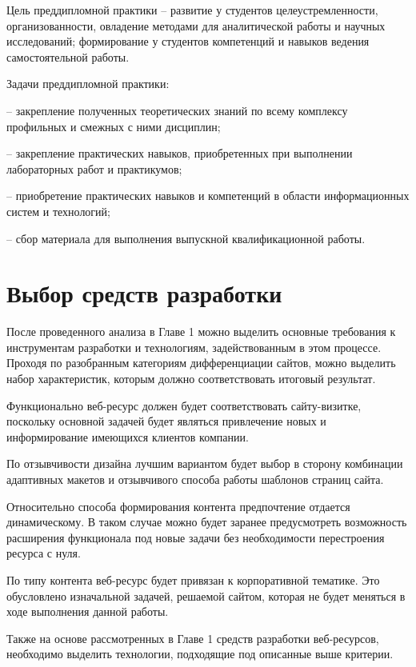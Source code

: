 
Цель преддипломной практики  – развитие у студентов целеустремленности, организованности, овладение методами для аналитической работы и научных исследований; формирование у студентов компетенций и навыков ведения самостоятельной работы. 

Задачи преддипломной практики: 

– закрепление полученных теоретических знаний по всему комплексу профильных и смежных с ними дисциплин; 

– закрепление практических навыков, приобретенных при выполнении лабораторных работ и практикумов; 

– приобретение практических навыков и компетенций в области информационных систем и технологий; 

– сбор материала для выполнения выпускной квалификационной работы.

\clearpage
\section{Выбор средств разработки}

После проведенного анализа в Главе 1 можно выделить основные требования к инструментам разработки и технологиям, задействованным в этом процессе.
Проходя по разобранным категориям дифференциации сайтов, можно выделить набор характеристик, которым должно соответствовать итоговый результат.

Функционально веб-ресурс должен будет соответствовать сайту-визитке, поскольку основной задачей будет являться привлечение новых и информирование имеющихся клиентов компании.

По отзывчивости дизайна лучшим вариантом будет выбор в сторону комбинации адаптивных макетов и отзывчивого способа работы шаблонов страниц сайта.

Относительно способа формирования контента предпочтение отдается динамическому.
В таком случае можно будет заранее предусмотреть возможность расширения функционала под новые задачи без необходимости перестроения ресурса с нуля.

По типу контента веб-ресурс будет привязан к корпоративной тематике.
Это обусловлено изначальной задачей, решаемой сайтом, которая не будет меняться в ходе выполнения данной работы.

Также на основе рассмотренных в Главе 1 средств разработки веб-ресурсов, необходимо выделить технологии, подходящие под описанные выше критерии.

